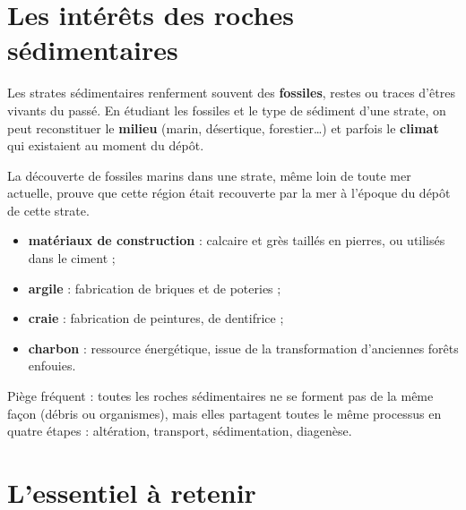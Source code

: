 \section{Les intérêts des roches sédimentaires}

\begin{propriete}
Les strates sédimentaires renferment souvent des \textbf{fossiles}, restes ou traces
d'êtres vivants du passé. En étudiant les fossiles et le type de sédiment d'une
strate, on peut reconstituer le \textbf{milieu} (marin, désertique, forestier\dots)
et parfois le \textbf{climat} qui existaient au moment du dépôt.
\end{propriete}

\begin{exemple}
La découverte de fossiles marins dans une strate, même loin de toute mer actuelle,
prouve que cette région était recouverte par la mer à l'époque du dépôt de cette
strate.
\end{exemple}

\begin{propriete}
\begin{itemize}
\item \textbf{matériaux de construction} : calcaire et grès taillés en pierres, ou
utilisés dans le ciment ;
\item \textbf{argile} : fabrication de briques et de poteries ;
\item \textbf{craie} : fabrication de peintures, de dentifrice ;
\item \textbf{charbon} : ressource énergétique, issue de la transformation
d'anciennes forêts enfouies.
\end{itemize}
\end{propriete}

\begin{remarque}
Piège fréquent : toutes les roches sédimentaires ne se forment pas de la même façon
(débris ou organismes), mais elles partagent toutes le même processus en quatre
étapes : altération, transport, sédimentation, diagenèse.
\end{remarque}

\section{L'essentiel à retenir}

